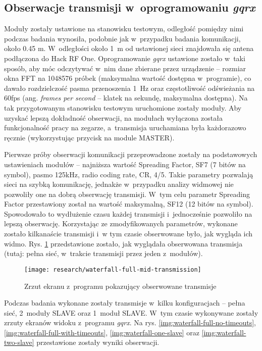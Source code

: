 \subsection{\label{sect:spectral-in-gqrx}Obserwacje transmisji w~oprogramowaniu \textsl{gqrx}} Moduły zostały ustawione
na stanowisku testowym, odległość pomiędzy nimi podczas badania wynosiła, podobnie jak w~przypadku badania komunikacji,
około 0.45 m. W~odległości około 1~m od ustawionej sieci znajdowała się antena podłączona do Hack RF One. Oprogramowanie
\textsl{gqrx} ustawione zostało w~taki sposób, aby móc odczytywać w~nim dane zbierane przez urządzenie -- rozmiar okna
FFT na 1048576 próbek (maksymalna wartość dostępna w~programie), co dawało rozdzielczość pasma przenoszenia 1~Hz oraz
częstotliwość odświeżania na 60fps (ang. \textsl{frames per second} -- klatek na sekundę, maksymalna dostępna). Na tak
przygotowanym stanowisku testowym uruchomione zostały moduły. Aby uzyskać lepszą dokładność obserwacji, na modułach
wyłączona została funkcjonalność pracy na zegarze, a~transmisja uruchamiana była każdorazowo ręcznie (wykorzystując
przycisk na module MASTER).

Pierwsze próby obserwacji komunikacji przeprowadzone zostały na podstawowych ustawieniach modułów -- najniższa wartość
Spreading Factor, SF7 (7 bitów na symbol), pasmo 125kHz, radio coding rate, CR, 4/5. Takie parametry pozwalają sieci na
szybką komunikację, jednakże w~przypadku analizy widmowej nie pozwoliły one na dobrą obserwację transmisji. W~tym celu
parametr Spreading Factor przestawiony został na wartość maksymalną, SF12 (12 bitów na symbol). Spowodowało to
wydłużenie czasu każdej transmisji i~jednocześnie pozwoliło na lepszą obserwację. Korzystając ze zmodyfikowanych
parametrów, wykonane zostało kilkanaście transmisji i~w tym czasie obserwowane było, jak wygląda ich widmo. Rys.
\ref{img:waterfall-full-mid-transmission} przedstawione zostało, jak wyglądała obserwowana transmisja (tutaj: pełna sieć,
w~trakcie transmisji przez jeden z~modułów).

\begin{figure}[!htbp]
    \centering
    \texttt{[image: research/waterfall-full-mid-transmission]}
    \caption{\label{img:waterfall-full-mid-transmission}Zrzut ekranu z~programu pokazujący obserwowane transmisje}
\end{figure}

\FloatBarrier
Podczas badania wykonane zostały transmisje w~kilku konfiguracjach -- pełna sieć, 2~moduły SLAVE oraz 1~moduł SLAVE.
W~tym czasie wykonywane zostały zrzuty ekranów widoku z~programu \textsl{gqrx}. Na rys.
\ref{img:waterfall-full-no-timeouts}, \ref{img:waterfall-full-with-timeouts}, \ref{img:waterfall-one-slave} oraz
\ref{img:waterfall-two-slave} przestawione zostały wyniki obserwacji.

